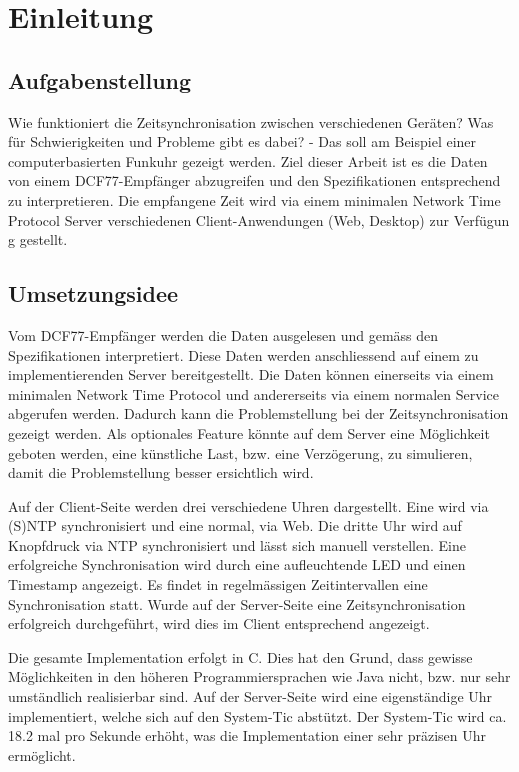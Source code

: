 
\chapter{Einleitung}



\section{Aufgabenstellung}

Wie funktioniert die Zeitsynchronisation zwischen verschiedenen Geräten? Was für Schwierigkeiten und Probleme gibt es dabei? - Das soll am Beispiel einer computerbasierten Funkuhr gezeigt werden. Ziel dieser Arbeit ist es die Daten von einem DCF77-Empfänger abzugreifen und den Spezifikationen entsprechend zu interpretieren. Die empfangene Zeit wird via einem minimalen Network Time Protocol Server verschiedenen Client-Anwendungen (Web, Desktop) zur Verfügun	g gestellt.

\section{Umsetzungsidee}

Vom DCF77-Empfänger werden die Daten ausgelesen und gemäss den Spezifikationen interpretiert. Diese Daten werden anschliessend auf einem zu implementierenden Server bereitgestellt. Die Daten können einerseits via einem minimalen Network Time Protocol und andererseits via einem normalen Service abgerufen werden. Dadurch kann die Problemstellung bei der Zeitsynchronisation gezeigt werden. Als optionales Feature könnte auf dem Server eine Möglichkeit geboten werden, eine künstliche Last, bzw. eine Verzögerung, zu simulieren, damit die Problemstellung besser ersichtlich wird.

Auf der Client-Seite werden drei verschiedene Uhren dargestellt. Eine wird via (S)NTP synchronisiert und eine normal, via Web. Die dritte Uhr wird auf Knopfdruck via NTP synchronisiert und lässt sich manuell verstellen. Eine erfolgreiche Synchronisation wird durch eine aufleuchtende LED und einen Timestamp angezeigt. Es findet in regelmässigen Zeitintervallen eine Synchronisation statt. Wurde auf der Server-Seite eine Zeitsynchronisation erfolgreich durchgeführt, wird dies im Client entsprechend angezeigt.

Die gesamte Implementation erfolgt in C. Dies hat den Grund, dass gewisse Möglichkeiten in den höheren Programmiersprachen wie Java nicht, bzw. nur sehr umständlich realisierbar sind. Auf der Server-Seite wird eine eigenständige Uhr implementiert, welche sich auf den System-Tic abstützt. Der System-Tic wird ca. 18.2 mal pro Sekunde erhöht, was die Implementation einer sehr präzisen Uhr ermöglicht. 
